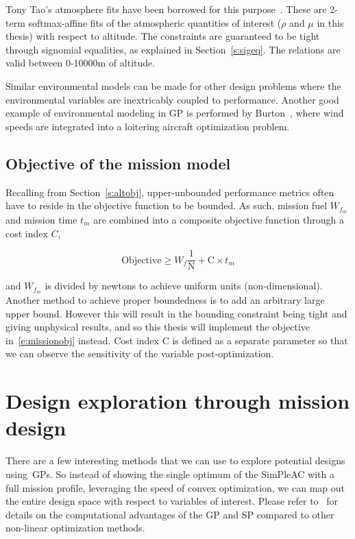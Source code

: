 Tony Tao's atmosphere fits have been borrowed for this purpose~\cite{tao_thesis}. These are
2-term softmax-affine fits of the atmospheric
quantities of interest ($\rho$ and $\mu$ in this thesis) with respect to altitude. The constraints
are guaranteed to be tight through signomial equalities, as explained in Section~\ref{s:sigeq}.
The relations are valid between 0-10000m of altitude.

Similar environmental models can be made for other design problems where the environmental
variables are inextricably coupled to performance. Another good example of environmental modeling
in \gls{GP} is performed by Burton~\cite{gassolar}, where wind speeds are integrated into
a loitering aircraft optimization problem.

\subsection{Objective of the mission model}
\label{s:missionobj}

Recalling from Section~\ref{s:altobj}, upper-unbounded performance metrics often have to
reside in the objective function to be bounded. As such, mission fuel $W_{f_m}$ and mission time $t_m$ are
combined into a composite objective function through a cost index $C$,

\begin{equation}
    \mathrm{Objective} \geq W_f \frac{1}{\mathrm{N}} + \mathrm{C} \times t_m
    \label{e:missionobj}
\end{equation}

and $W_{f_m}$ is divided by newtons to achieve uniform units (non-dimensional).
Another method to achieve proper boundedness is to add an arbitrary large upper bound. However
this will result in the bounding constraint being tight and giving unphysical results, and so
this thesis will implement the objective in~\ref{e:missionobj} instead.
Cost index $\mathrm{C}$ is defined as a separate parameter so that we can observe the sensitivity
of the variable post-optimization.

\section{Design exploration through mission design}

There are a few interesting methods that we can use to explore
potential designs using~\gls{GP}s. So instead of showing the single optimum of the
SimPleAC with a full mission profile, leveraging the speed of convex optimization,
we can map out the entire design space with respect to variables of interest.
Please refer to~\cite{power_of_log} for details on the computational advantages of the \gls{GP}
and \gls{SP} compared to other non-linear optimization methods.

